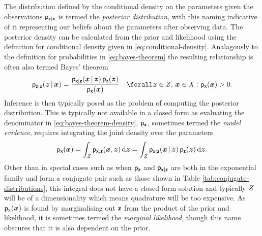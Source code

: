 The distribution defined by the conditional density on the parameters given the observations $\mathsf{p}_{\boldsymbol{\mathsf{z}}|\boldsymbol{\mathsf{x}}}$ is termed the \emph{posterior distribution}, with this naming indicative of it representing our beliefs about the parameters after observing data. The posterior density can be calculated from the prior and likelihood using the definition for conditional density given in \eqref{eq:conditional-density}. Analagously to the definition for probabilities in \eqref{eq:bayes-theorem} the resulting relationship is often also termed Bayes' theorem
\begin{equation}\label{eq:bayes-theorem-density}
 \pden{\rvct{z}|\rvct{x}}(\vct{z}\gvn\vct{x}) =
 \frac{\pden{\rvct{x}|\rvct{z}}(\vct{x}\gvn\vct{z})\,\pden{\rvct{z}}(\vct{z})}{\pden{\rvct{x}}(\vct{x})}
 \quad \forall \vct{z} \in \set{Z},\,\vct{x} \in \set{X} : \pden{\rvct{x}}(\vct{x}) > 0.
\end{equation}
Inference is then typically posed as the problem of computing the posterior distribution. This is typically not available in a closed form as evaluating the denominator in \eqref{eq:bayes-theorem-density}, $\mathsf{p}_{\boldsymbol{\mathsf{x}}}$, sometimes termed the \emph{model evidence}, requires integrating the joint density over the parameters
\begin{equation}\label{eq:model-evidence-integral}
 \mathsf{p}_{\boldsymbol{\mathsf{x}}}(\boldsymbol{x}) = 
 \int_{\mathit{Z}} \mathsf{p}_{\boldsymbol{\mathsf{x}},\boldsymbol{\mathsf{z}}}(\boldsymbol{x},\boldsymbol{z})\,\mathrm{d}\boldsymbol{z} =
 \int_{\mathit{Z}} \mathsf{p}_{\boldsymbol{\mathsf{x}}|\boldsymbol{\mathsf{z}}}(\boldsymbol{x}\operatorname{|}\boldsymbol{z})\,\mathsf{p}_{\boldsymbol{\mathsf{z}}}(\boldsymbol{z})
 \,\mathrm{d}\boldsymbol{z}.
\end{equation}
Other than in special cases such as when $\mathsf{p}_{\boldsymbol{\mathsf{z}}}$ and $\mathsf{p}_{\boldsymbol{\mathsf{x}}|\boldsymbol{\mathsf{z}}}$ are both in the exponential family and form a conjugate pair such as those shown in Table \ref{tab:conjugate-distributions}, this integral does not have a closed form solution and typically $\mathit{Z}$ will be of a dimensionality which means quadrature will be too expensive. As $\mathsf{p}_{\mathsf{x}}(\boldsymbol{x})$ is found by marginalising out $\boldsymbol{\mathsf{z}}$ from the product of the prior and likelihood, it is sometimes termed the \emph{marginal likelihood}, though this name obscures that it is also dependent on the prior.

